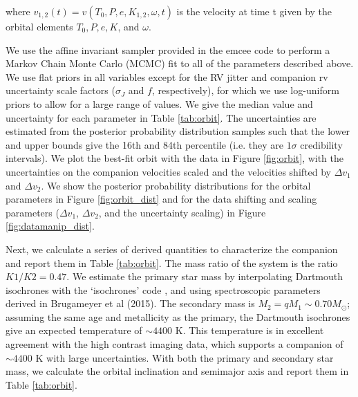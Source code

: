\documentclass[twocolumn]{emulateapj}
\begin{document}
where $v_{1,2}(t) = v(T_0, P, e, K_{1,2}, \omega, t)$ is the velocity at time t given by the orbital elements $T_0, P, e, K$, and $\omega$.

We use the affine invariant sampler provided in the emcee code \citep{emcee} to perform a Markov Chain Monte Carlo (MCMC) fit to all of the parameters described above. We use flat priors in all variables except for the RV jitter and companion rv uncertainty scale factors ($\sigma_J$ and $f$, respectively), for which we use log-uniform priors to allow for a large range of values.  We give the median value and uncertainty for each parameter in Table \ref{tab:orbit}. The uncertainties are estimated from the posterior probability distribution samples such that the lower and upper bounds give the 16th and 84th percentile (i.e. they are $1\sigma$ credibility intervals). We plot the best-fit orbit with the data in Figure \ref{fig:orbit}, with the uncertainties on the companion velocities scaled and the velocities shifted by $\Delta v_1$ and $\Delta v_2$. We show the posterior probability distributions for the orbital parameters in Figure \ref{fig:orbit_dist} and for the data shifting and scaling parameters ($\Delta v_1$, $\Delta v_2$, and the uncertainty scaling) in Figure \ref{fig:datamanip_dist}.

Next, we calculate a series of derived quantities to characterize the companion and report them in Table \ref{tab:orbit}. The mass ratio of the system is the ratio $K1/K2 = 0.47$. We estimate the primary star mass by interpolating Dartmouth isochrones \citep{Dotter2008} with the `isochrones' code \citep[described in][]{Montet2015}, and using spectroscopic parameters derived in Brugameyer et al (2015). The secondary mass is $M_2 = qM_1 \sim 0.70 M_{\odot}$; assuming the same age and metallicity as the primary, the Dartmouth isochrones give an expected temperature of $\sim 4400 $ K. This temperature is in excellent agreement with the high contrast imaging data, which supports a companion of $\sim 4400$ K with large uncertainties. With both the primary and secondary star mass, we calculate the orbital inclination and semimajor axis and report them in Table \ref{tab:orbit}.
\end{document}
